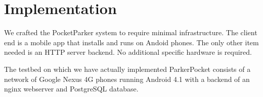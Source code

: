 \section{Implementation}
\label{sec-implementation}

We crafted the PocketParker system to require minimal infrastructure.  The
client end is a mobile app that installs and runs on Andoid phones.  The
only other item needed is an HTTP server backend.  No additional specific
hardware is required.

The testbed on which we have actually implemented ParkerPocket consists of
a network of Google Nexus 4G phones running Android 4.1 with a backend of
an nginx webserver and PostgreSQL database.



